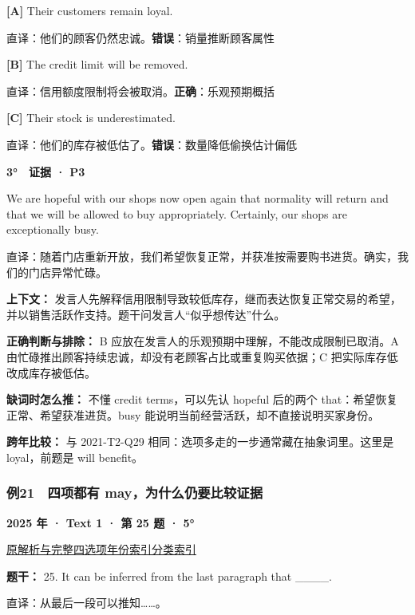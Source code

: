\documentclass[11pt,a4paper]{article}
\begin{document}
\noindent\textbf{[A]} Their customers remain loyal.\par\nopagebreak
\noindent 直译：他们的顾客仍然忠诚。\quad\textbf{错误}：销量推断顾客属性\par\smallskip
{}\noindent\textbf{[B]} The credit limit will be removed.\par\nopagebreak
\noindent 直译：信用额度限制将会被取消。\quad\textbf{正确}：乐观预期概括\par\smallskip
{}\noindent\textbf{[C]} Their stock is underestimated.\par\nopagebreak
\noindent 直译：他们的库存被低估了。\quad\textbf{错误}：数量降低偷换估计偏低\par\smallskip
\begin{evidence}\textbf{3°　证据 · P3}\par We are hopeful with our shops now open again that normality will return and that we will be allowed to buy appropriately. Certainly, our shops are exceptionally busy.\par 直译：随着门店重新开放，我们希望恢复正常，并获准按需要购书进货。确实，我们的门店异常忙碌。\end{evidence}
\noindent\textbf{上下文：} 发言人先解释信用限制导致较低库存，继而表达恢复正常交易的希望，并以销售活跃作支持。题干问发言人“似乎想传达”什么。\par\smallskip
\noindent\textbf{正确判断与排除：} B 应放在发言人的乐观预期中理解，不能改成限制已取消。A 由忙碌推出顾客持续忠诚，却没有老顾客占比或重复购买依据；C 把实际库存低改成库存被低估。\par\smallskip
\noindent\textbf{缺词时怎么推：} 不懂 credit terms，可以先认 hopeful 后的两个 that：希望恢复正常、希望获准进货。busy 能说明当前经营活跃，却不直接说明买家身份。\par\smallskip
\noindent\textbf{跨年比较：} 与 2021-T2-Q29 相同：选项多走的一步通常藏在抽象词里。这里是 loyal，前题是 will benefit。\par\smallskip
\clearpage
\subsubsection{例21　四项都有 may，为什么仍要比较证据}\label{case-2025-T1-Q25}
\noindent\textbf{2025 年 · Text 1 · 第 25 题 · 5°}\par\noindent \href{https://zj139.github.io/math-notes/english/cabb22521ad878901633c3a3/\#q25}{原解析与完整四选项}\quad \hyperref[idx-2025-T1-Q25]{年份索引}\quad \hyperref[class-R09]{分类索引}\par\smallskip
\noindent\textbf{题干：} 25. It can be inferred from the last paragraph that \_\_\_\_.\par\smallskip
直译：从最后一段可以推知……。
\end{document}
